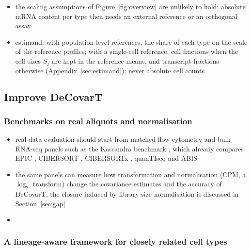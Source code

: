 \documentclass[pdflatex, sn-nature]{sn-jnl}
\theoremstyle{thmstyleone}%
\theoremstyle{thmstyletwo}%
\theoremstyle{thmstylethree}%
\begin{document}
\begin{itemize}
        sample scale of \eqref{eq:sc-model} is estimated inside the likelihood and is not such a normalisation
        (Remark~\ref{rem:scale-not-closure})
  \item the scaling assumptions of Figure~\ref{fig:overview} are unlikely to hold; absolute mRNA content per
        type then needs an external reference or an orthogonal assay
  \item estimand: with population-level references, the share of each type on the scale of the reference profiles;
        with a single-cell reference, cell fractions when the cell sizes \(S_{j}\) are kept in the reference means, and
        transcript fractions otherwise (Appendix~\ref{sec:estimand}); never absolute cell counts
\end{itemize}



\subsection{Improve DeCovarT}
\label{sec:improve}

\subsubsection{Benchmarks on real aliquots and normalisation}

\begin{itemize}
  \item real-data evaluation should start from matched flow-cytometry and bulk RNA-seq panels such as the Kassandra
        benchmark \cite{zaitsevPreciseReconstructionTME2022}, which already compares EPIC
        \cite{racleSimultaneousEnumerationCancer2017}, CIBERSORT \cite{newmanRobustEnumerationCell2015}, CIBERSORTx
        \cite{newmanDeterminingCellType2019}, quanTIseq \cite{finotello_etal19} and ABIS
        \cite{monacoRNASeqSignaturesNormalized2019}
  \item the same panels can measure how transformation and normalisation (CPM, a \(\log_{2}\) transform) change the
        covariance estimates and the accuracy of DeCovarT; the closure induced by library-size normalisation is
        discussed in Section~\ref{sec:gap}
  \item[] 
\end{itemize}


\subsubsection{A lineage-aware framework for closely related cell types}
\label{sec:lineage}
\end{document}
